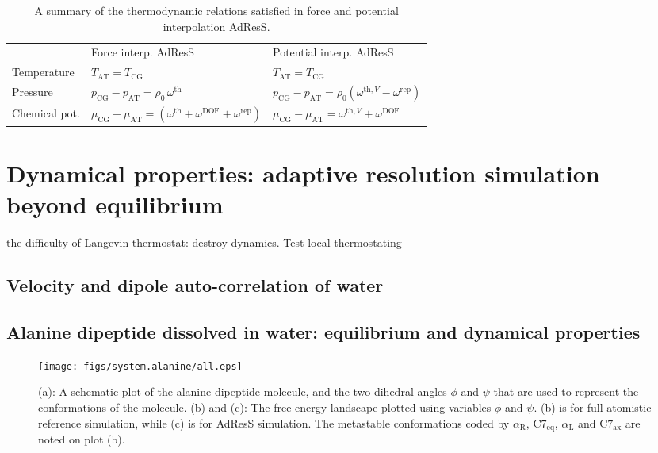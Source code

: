 \documentclass[epjST]{svjour}
\newcommand{\recheck}[1]{{\color{red} #1}}
\newcommand{\AT}[0]{\textrm{AT}}
\newcommand{\CG}[0]{\textrm{CG}}
\newcommand{\thf}{{\textrm{th}}}
\newcommand{\rep}{{\textrm{rep}}}
\newcommand{\dof}{{\textrm{DOF}}}
\newcommand{\confa}[0]{{\alpha_{\textrm{R}}}}
\newcommand{\confb}[0]{{\textrm{C}7_{\textrm{eq}}}}
\newcommand{\confc}[0]{{\alpha_{\textrm{L}}}}
\newcommand{\confd}[0]{{\textrm{C}7_{\textrm{ax}}}}
\begin{document}
\begin{table}
  \centering
  \caption{A summary of the thermodynamic relations satisfied in force and potential interpolation AdResS.}
  \label{tab:thermodynamic}
  \begin{tabular*}{0.99\textwidth}{@{\extracolsep{\fill}}lll}\hline\hline
    &         Force interp. AdResS     &       Potential interp. AdResS \\
    Temperature    &   {$T_\AT = T_\CG$}                                                & {$T_\AT = T_\CG$}                                        \\
    Pressure       &   {$p_\CG - p_\AT = \rho_0\, \omega^\thf$}                          & {$p_\CG - p_\AT = \rho_0(\omega^{\thf,V} - \omega^\rep)$} \\
    Chemical pot.  &   {$\mu_\CG - \mu_\AT = (\omega^\thf + \omega^\dof +\omega^\rep)$}   & {$\mu_\CG - \mu_\AT = \omega^{\thf,V}+ \omega^\dof$}      \\\hline\hline
  \end{tabular*}
\end{table}


\section{Dynamical properties: adaptive resolution simulation beyond equilibrium}
\label{sec:dynamical}

\recheck{the difficulty of Langevin thermostat: destroy dynamics. Test local thermostating~\cite{wang2014exploring}
}

\subsection{Velocity and dipole auto-correlation of water}


\subsection{Alanine dipeptide dissolved in water: equilibrium and dynamical properties}

\begin{figure}
  \centering
  \texttt{[image: figs/system.alanine/all.eps]}
  \caption{(a): A schematic plot of the alanine dipeptide molecule,
    and the two dihedral angles $\phi$ and $\psi$ that are used to
    represent the conformations of the molecule. (b) and (c): The free
    energy landscape plotted using variables $\phi$ and $\psi$.  (b)
    is for full atomistic reference simulation, while (c) is for
    AdResS simulation. The metastable conformations coded by $\confa$, $\confb$, $\confc$ and $\confd$
    are noted on plot (b).}
  \label{fig:ala}
\end{figure}
\end{document}
